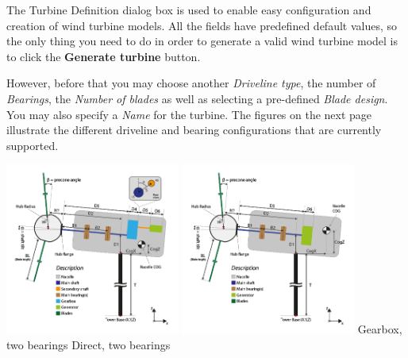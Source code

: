 The Turbine Definition dialog box is used to enable easy configuration and
creation of wind turbine models. All the fields have predefined default values,
so the only thing you need to do in order to generate a valid wind turbine model
is to click the \textbf{Generate turbine} button.

However, before that you may choose another {\sl Driveline type}, the number of
{\sl Bearings}, the {\sl Number of blades} as well as selecting a pre-defined
{\sl Blade design}. You may also specify a {\sl Name} for the turbine.
The figures on the next page illustrate the different driveline and bearing
configurations that are currently supported.

\includegraphics[width=0.43\textwidth]{Figures/3b-TurbineDefinition4}\hfill
\includegraphics[width=0.43\textwidth]{Figures/3b-TurbineDefinition1}
\hspace*{0.1\textwidth} Gearbox, two bearings
\hspace*{0.3\textwidth} Direct, two bearings

